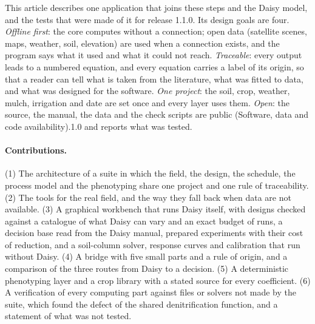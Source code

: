 \documentclass[preprint,12pt]{elsarticle}
\begin{document}
This article describes one application that joins these steps and the Daisy model, and the tests that were made of it for release 1.1.0. Its design goals are four. \emph{Offline first}: the core computes without a connection; open data (satellite scenes, maps, weather, soil, elevation) are used when a connection exists, and the program says what it used and what it could not reach. \emph{Traceable}: every output leads to a numbered equation, and every equation carries a label of its origin, so that a reader can tell what is taken from the literature, what was fitted to data, and what was designed for the software. \emph{One project}: the soil, crop, weather, mulch, irrigation and date are set once and every layer uses them. \emph{Open}: the source, the manual, the data and the check scripts are public (Software, data and code availability).1.0 and reports what was tested.

\paragraph{Contributions.} (1) The architecture of a suite in which the field, the design, the schedule, the process model and the phenotyping share one project and one rule of traceability. (2) The tools for the real field, and the way they fall back when data are not available. (3) A graphical workbench that runs Daisy itself, with designs checked against a catalogue of what Daisy can vary and an exact budget of runs, a decision base read from the Daisy manual, prepared experiments with their cost of reduction, and a soil-column solver, response curves and calibration that run without Daisy. (4) A bridge with five small parts and a rule of origin, and a comparison of the three routes from Daisy to a decision. (5) A deterministic phenotyping layer and a crop library with a stated source for every coefficient. (6) A verification of every computing part against files or solvers not made by the suite, which found the defect of the shared denitrification function, and a statement of what was not tested.
\end{document}
